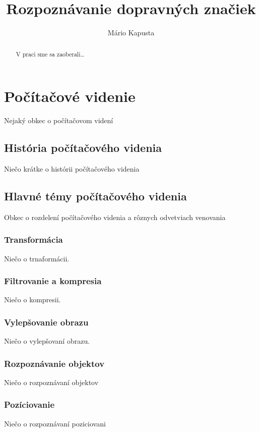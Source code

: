 \documentclass[12pt]{article}
\begin{document}
\title{Rozpoznávanie dopravných značiek}

\author{Mário Kapusta}
\maketitle
\thispagestyle{empty}
\clearpage
\tableofcontents
{}
\thispagestyle{empty}
\clearpage
\listoftables
\thispagestyle{empty}
\clearpage
\listoffigures
\thispagestyle{empty}
\clearpage
\begin{abstract}
V praci sme sa zaoberali\ldots
\end{abstract}
\clearpage

\section{Počítačové videnie}
Nejaký obkec o počítačovom videní
\subsection{História počítačového videnia}
Niečo krátke o histórii počítačového videnia
\subsection{Hlavné témy počítačového videnia}
Obkec o rozdelení počítačového videnia a rôznych odvetviach venovania
\subsubsection{Transformácia}
Niečo o trnaformácii.
\subsubsection{Filtrovanie a kompresia}
Niečo o kompresii.
\subsubsection{Vylepšovanie obrazu}
Niečo o vylepšovaní obrazu.
\subsubsection{Rozpoznávanie objektov}
Niečo o rozpoznávaní objektov
\subsubsection{Pozíciovanie}
Niečo o rozpoznávaní poziciovani
\end{document}
